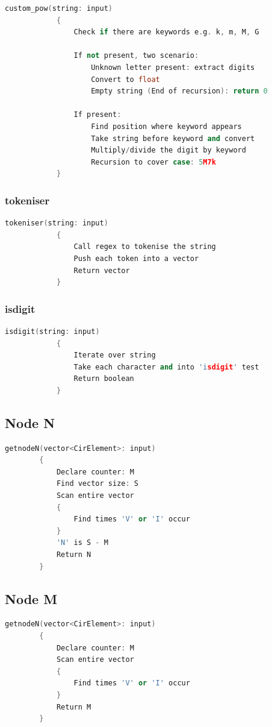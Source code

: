 \documentclass[a4paper, titlepage]{article}
\begin{document}
    \begin{lstlisting}[language=C++]
        custom_pow(string: input)
            {
                Check if there are keywords e.g. k, m, M, G
    
                If not present, two scenario:
                    Unknown letter present: extract digits 
                    Convert to float
                    Empty string (End of recursion): return 0
    
                If present:
                    Find position where keyword appears
                    Take string before keyword and convert
                    Multiply/divide the digit by keyword
                    Recursion to cover case: 5M7k
            }
    \end{lstlisting}

    \subsubsection{tokeniser}
    \begin{lstlisting}[language=C++]
        tokeniser(string: input)
            {
                Call regex to tokenise the string 
                Push each token into a vector 
                Return vector
            }
    \end{lstlisting}

    \subsubsection{isdigit}
    \begin{lstlisting}[language=C++]
        isdigit(string: input)
            {
                Iterate over string
                Take each character and into 'isdigit' test
                Return boolean
            }
    \end{lstlisting}
    \subsection{Node N}
    \begin{lstlisting}[language=C++]
        getnodeN(vector<CirElement>: input)
        {
            Declare counter: M
            Find vector size: S
            Scan entire vector
            {
                Find times 'V' or 'I' occur
            }
            'N' is S - M
            Return N
        }
    \end{lstlisting}
    \subsection{Node M}
    \begin{lstlisting}[language=C++]
        getnodeN(vector<CirElement>: input)
        {
            Declare counter: M
            Scan entire vector
            {
                Find times 'V' or 'I' occur
            }
            Return M
        }
    \end{lstlisting}
\end{document}
